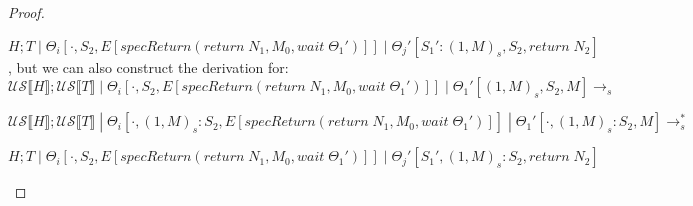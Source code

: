 \documentclass[9pt]{article}
\newcommand\specStep{\rightarrow_{s}}
\newcommand{\eval}[1]{E[#1]}
\newcommand{\unSpec}[1]{\mathcal{US} \llbracket #1 \rrbracket}
\newcommand{\specActions}[1]{\mathcal{SA} \llbracket #1 \rrbracket}
\begin{document}
\begin{proof}
\begin{itemize}
$H; T \; | \; \Theta_i[\cdot, S_2, \eval{specReturn(return \; N_1, M_0, wait \; \Theta_1')}] \; | \; \Theta_j'[S_1' : (1, M)_s, S_2, return\; N_2]$, but we can also construct the derivation for: $\unSpec{H}; \unSpec{T} \; | \; \Theta_i[\cdot, S_2, \eval{specReturn(return \; N_1, M_0, wait \; \Theta_1')}] \; | \; \Theta_1'[(1, M)_s, S_2, M] \specStep $

$\unSpec{H}; \unSpec{T} \; | \; \Theta_i[\cdot, (1, M)_s : S_2, \eval{specReturn(return \; N_1, M_0, wait \; \Theta_1')}] \; | \; \Theta_1'[\cdot, (1, M)_s : S_2, M] \specStep^*$

$H; T \; | \; \Theta_i[\cdot, S_2, \eval{specReturn(return \; N_1, M_0, wait \; \Theta_1')}] \; | \; \Theta_j'[S_1',  (1, M)_s : S_2, return\; N_2]$

\begin{comment}%
Now, we must show $WF(T_{spar}')$.  Consider two cases:

\begin{itemize}
\item $S_1 = \cdot$, for this case, let $T_1 = \unSpec{T}, T_1' = T$,\\
$T_2 = \Theta_i[\cdot, S_2, \eval{specReturn(return \; N_1, wait \; \Theta_1')}] \; | \; \Theta_1'[\cdot : (1, M)_s, S_2', M]$, and \\
$T_2' = \Theta_{i+1}[\cdot, S_2, \eval{specReturn(return \; N_1, wait \; \Theta_1')}] \; | \; \Theta_{j+1}'[\cdot, (1, M)_s : S_2', M']$

Since $\specActions{T_2} = \specActions{T_2'}$, we can apply Lemma \ref{independence} to get $v\vec{i}.(T_1 \; | T_2) \specStep^* v\vec{i}.(T_1 \; | \; T_2') \specStep^* v\vec{i}.(T_1' \; | \; T_2')$.

Since $\unSpec{T_{spar}'} = v\vec{i}.(T_1 \; | \; T_2')$ and $T_{spar}' = v\vec{i}.(T_1' \; | \; T_2')$, we have $WF(T_{spar}')$ 

\item $S_1 = S_1' : (i', M^*)_x^y$, for this case, let $T_1 = \unSpec{T}, T_1' = T$,\\
$T_2 = \Theta_i[\cdot, S_2, \eval{specReturn(return \; N_1, wait \; \Theta_1')}] \; | \; \Theta_1'[S_1' : (j', M^*)_x^y : (1, M)_s, S_2', M]$, \\
$T_2' = \Theta_{i+1}[\cdot, S_2, \eval{specReturn(return \; N_1, wait \; \Theta_1')}] \; | \; \Theta_{j'}'[S_1' : (j', M^*)_x^y, (1, M)_s : S_2', M^*]$, and  \\
$T_2'' = \Theta_{i+1}[\cdot, S_2, \eval{specReturn(return \; N_1, wait \; \Theta_1')}] \; | \; \Theta_{j+1}'[S_1' : (j', M^*)_x^y, (1, M)_s : S_2', M']$.  


\end{comment}
\end{itemize}
\end{proof}
\end{document}
